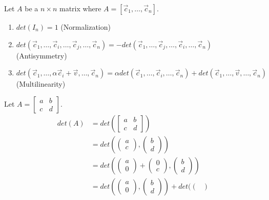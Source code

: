 Let $A$ be a $n\times n$ matrix where $A=[\vec{c}_1,\ldots,\vec{c}_n]$.
\begin{enumerate}
    \item $det(I_n)=1$ (Normalization)
    \item $det(\vec{c}_1,\ldots,\vec{c}_i,\ldots,\vec{c}_j,\ldots,\vec{c}_n)=-det(\vec{c}_1,\ldots,\vec{c}_j,\ldots,\vec{c}_i,\ldots,\vec{c}_n)$ (Antisymmetry)
    \item $det(\vec{c}_1,\ldots,
    \alpha\vec{c}_i+\vec{v},\ldots,\vec{c}_n)=\alpha det(\vec{c}_1,\ldots,
    \vec{c}_i,\ldots,\vec{c}_n)+det(\vec{c}_1,\ldots,
    \vec{v},\ldots,\vec{c}_n)$ (Multilinearity)
\end{enumerate}
\begin{example}
    Let $A=\begin{bmatrix}
        a & b \\
        c & d
    \end{bmatrix}$.
    \begin{align*}
        det(A)&=det(\begin{bmatrix}
        a & b \\
        c & d
    \end{bmatrix})\\
    &=det(\begin{pmatrix}
        a \\ c
    \end{pmatrix}, \begin{pmatrix}
        b \\ d
    \end{pmatrix})\\
    &=det(\begin{pmatrix}
        a \\ 0
    \end{pmatrix}+\begin{pmatrix}
        0 \\ c
    \end{pmatrix}, \begin{pmatrix}
        b \\ d
    \end{pmatrix})\\
    &=det(\begin{pmatrix}
        a \\ 0
    \end{pmatrix}, \begin{pmatrix}
        b \\ d
    \end{pmatrix})+det(\begin{pmatrix}

\end{pmatrix}
\end{align*}
\end{example}
